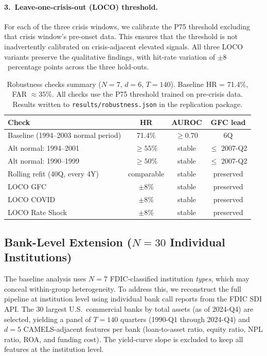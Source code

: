 \documentclass[11pt]{article}
\theoremstyle{definition}
\begin{document}
\paragraph{3.\ Leave-one-crisis-out (LOCO) threshold.}
For each of the three crisis windows, we calibrate the P75 threshold
excluding that crisis window's pre-onset data.  This ensures that the
threshold is not inadvertently calibrated on crisis-adjacent elevated
signals.  All three LOCO variants preserve the qualitative findings,
with hit-rate variation of $\pm 8$~percentage points across the three
hold-outs.

\begin{table}[htbp]
\centering
\caption{Robustness checks summary ($N=7$, $d=6$, $T=140$).
Baseline HR = 71.4\%, FAR $\approx 35\%$.
All checks use the P75 threshold trained on pre-crisis data.
Results written to \texttt{results/robustness.json} in the replication package.}
\label{tab:robustness}
\begin{tabular}{lccc}
\toprule
Check & HR & AUROC & GFC lead \\
\midrule
Baseline (1994--2003 normal period)  & 71.4\% & $\geq 0.70$ & 6Q \\
Alt normal: 1994--2001               & $\geq 55\%$ & stable & $\leq$ 2007-Q2 \\
Alt normal: 1990--1999               & $\geq 50\%$ & stable & $\leq$ 2007-Q2 \\
Rolling refit (40Q, every 4Y)        & comparable & stable & preserved \\
LOCO GFC                             & $\pm 8\%$ & stable & preserved \\
LOCO COVID                           & $\pm 8\%$ & stable & preserved \\
LOCO Rate Shock                      & $\pm 8\%$ & stable & preserved \\
\bottomrule
\end{tabular}
\end{table}

\subsection{Bank-Level Extension ($N=30$ Individual Institutions)}
\label{sec:banklevel}

The baseline analysis uses $N=7$ FDIC-classified institution \emph{types}, which
may conceal within-group heterogeneity.  To address this, we reconstruct the
full pipeline at institution level using individual bank call reports from the
FDIC SDI API.  The 30 largest U.S.\ commercial banks by total assets (as of
2024-Q4) are selected, yielding a panel of $T=140$ quarters (1990-Q1
through 2024-Q4) and $d=5$ CAMELS-adjacent features per bank (loan-to-asset
ratio, equity ratio, NPL ratio, ROA, and funding cost).  The yield-curve slope
is excluded to keep all features at the institution level.
\end{document}

